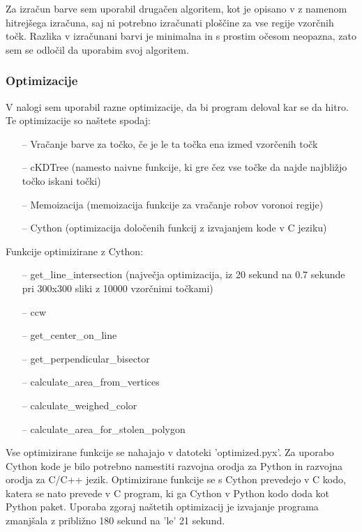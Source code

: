 \documentclass{egpubl}
\begin{document}
	Za izračun barve sem uporabil drugačen algoritem, kot je opisano v \cite{algorithm} z namenom hitrejšega izračuna, saj ni potrebno izračunati ploščine za vse regije vzorčnih točk. Razlika v izračunani barvi je minimalna in s prostim očesom neopazna, zato sem se odločil da uporabim svoj algoritem.

	\subsubsection{Optimizacije}
	V nalogi sem uporabil razne optimizacije, da bi program deloval kar se da hitro. Te optimizacije so naštete spodaj:
	
	\begin{itemize} 
		\item[--]  Vračanje barve za točko, če je le ta točka ena izmed vzorčenih točk
		\item[--] cKDTree (namesto naivne funkcije, ki gre čez vse točke da najde najbližjo točko iskani točki)
		\item[--] Memoizacija (memoizacija funkcije za vračanje robov voronoi regije)
		\item[--] Cython (optimizacija določenih funkcij z izvajanjem kode v C jeziku)
	\end{itemize}
	
	\noindent
	Funkcije optimizirane z Cython:
	\begin{itemize} 
		\item[--] get\_line\_intersection (največja optimizacija, iz 20 sekund na 0.7 sekunde pri 300x300 sliki z 10000 vzorčnimi točkami)
		\item[--] ccw
		\item[--] get\_center\_on\_line
		\item[--] get\_perpendicular\_bisector
		\item[--] calculate\_area\_from\_vertices
		\item[--] calculate\_weighed\_color
		\item[--] calculate\_area\_for\_stolen\_polygon
	\end{itemize}

	Vse optimizirane funkcije se nahajajo v datoteki 'optimized.pyx'. Za uporabo Cython kode je bilo potrebno namestiti razvojna orodja za Python in razvojna orodja za C/C++ jezik. Optimizirane funkcije se s Cython prevedejo v C kodo, katera se nato prevede v C program, ki ga Cython v Python kodo doda kot Python paket. Uporaba zgoraj naštetih optimizacij je izvajanje programa zmanjšala z približno 180 sekund na 'le' 21 sekund.
	
\end{document}

